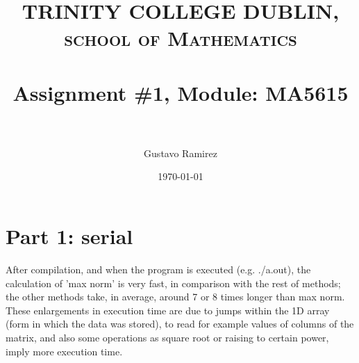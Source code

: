 \documentclass[paper=a4, fontsize=11pt]{scrartcl} %
\title{	
\normalfont \normalsize 
\textsc{TRINITY COLLEGE DUBLIN, school of Mathematics} \\ [25pt] %
\horrule{0.5pt} \\[0.4cm] %
\huge Assignment \#1, Module: MA5615 \\ %
\horrule{2pt} \\[0.5cm] %
}
\author{Gustavo Ramirez} %
\date{\normalsize\today} %
\numberwithin{equation}{section} %
\numberwithin{figure}{section} %
\numberwithin{table}{section} %
\begin{document}
\maketitle %


\begin{comment}
\section{Problem description}

\begin{enumerate}
\item 
\item 
\item 
\item 
\end{enumerate}

\end{comment}

\newpage


\begin{comment}

USEFUL LINKS:

official sources for terminology:
-----
http://www.intel.com/content/www/us/en/support/topics/glossary.html
https://www-01.ibm.com/software/globalization/terminology/a.html
-----




about IMB processors:
-----

insert in google: list of ibm processors
https://en.wikipedia.org/wiki/List_of_IBM_products
https://www-01.ibm.com/software/passportadvantage/guide_to_identifying_processor_family.html
http://www.nextplatform.com/2015/08/10/ibm-roadmap-extends-power-chips-to-2020-and-beyond/
http://www.theverge.com/2015/7/9/8919091/ibm-7nm-transistor-processor
https://www.ibm.com/developerworks/ibmi/library/i-ibmi-7_2-and-ibm-power8/
-----




\end{comment}


\section{Part 1: serial}

After compilation, and when the program is executed (e.g. ./a.out), the calculation of 'max norm' is very fast, in comparison with the rest of methods; the other methods take, in average, around 7 or 8 times longer than max norm. These enlargements in execution time are due to jumps within the 1D array (form in which the data was stored), to read for example values of columns of the matrix, and also some operations as square root or raising to certain power, imply more execution time.
\end{document}
